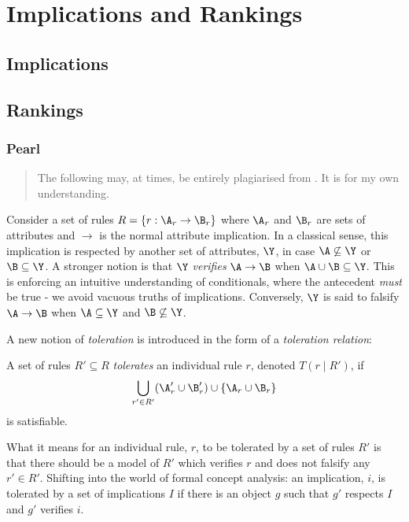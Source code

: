 \section{Implications and Rankings}
\label{Section: Impl}

\subsection{Implications}
\label{subsec: Implications}

\subsection{Rankings}
\label{subsec: Ranking}

\subsubsection{Pearl}
\label{rankings| pearl}
\begin{quote}
    The following may, at times, be entirely plagiarised from \cite{Pearl_SystemZ}. It is for my own understanding.
\end{quote}
%
Consider a set of rules $R = \{r:{\A_r \rightarrow \B_r}\}$ where $\A_r$ and $\B_r$ are sets of attributes and $\rightarrow$ is the normal attribute implication. In a classical sense, this implication is respected by another set of attributes, $\Y$, in case ${\A} \not \subseteq \Y$ or ${\B} \subseteq \Y$. A stronger notion is that $\Y$ \textit{verifies} ${\A} \rightarrow {\B}$ when ${\A} \cup {\B} \subseteq \Y$. This is enforcing an intuitive understanding of conditionals, where the antecedent \textit{must} be true - we avoid vacuous truths of implications. \cite{Pearl_SystemZ} Conversely, $\Y$ is said to falsify ${\A} \rightarrow {\B}$ when ${\A} \subseteq \Y$ and ${\B} \not \subseteq \Y$.

A new notion of \textit{toleration} is introduced in the form of a \textit{toleration relation}:
%
\begin{definition}
    A set of rules $R' \subseteq R$ \textit{tolerates} an individual rule $r$, denoted $T(r\mid R')$, if \[\bigcup\limits_{r' \in R'} ({\A_r' \cup \B_r'}) \cup \{{\A_r \cup \B_r}\}\] is satisfiable.
\end{definition}
%
What it means for an individual rule, $r$, to be tolerated by a set of rules $R'$ is that there should be a model of $R'$ which verifies $r$ and does not falsify any $r' \in R'$. Shifting into the world of formal concept analysis: an implication, $i$, is tolerated by a set of implications $I$ if there is an object $g$ such that $g'$ respects $I$ and $g'$ verifies $i$.

